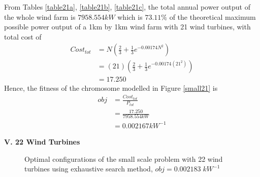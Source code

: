         From Tables \ref{table21a}, \ref{table21b}, \ref{table21c}, the total annual power output of the whole wind farm is $7958.554kW$ which is $73.11\%$ of the theoretical maximum possible power output of a 1km by 1km wind farm with 21 wind turbines, with total cost of
        \begin{align*}
            Cost_{tot}
            &= N\left(\frac{2}{3} + \frac{1}{3}e^{-0.00174N^2}\right) \\
            &= \left(21\right)\left(\frac{2}{3} + \frac{1}{3}e^{-0.00174\left(21^2\right)}\right) \\
            &=17.250
        \end{align*}
        Hence, the fitness of the chromosome modelled in Figure \ref{small21} is
        \begin{align*}
            obj
            &=\frac{Cost_{tot}}{P_{tot}} \\
            &=\frac{17.250}{7958.554kW} \\
            &=0.002167kW^{-1}
        \end{align*}
        
    \textbf{V. 22 Wind Turbines}
        \begin{figure}[H]
            \centering
            \qquad
            \qquad
            \qquad
            \caption{Optimal configurations of the small scale problem with 22 wind turbines using exhaustive search method, $obj=0.002183\;kW^{-1}$}
            \label{small22}
        \end{figure}
        
